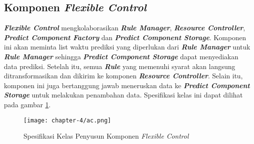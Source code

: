 \subsection{Komponen \textit{Flexible Control}}

\textbf{\textit{Flexible Control}} mengkolaborasikan \textbf{\textit{Rule Manager}}, \textbf{\textit{Resource Controller}}, \textbf{\textit{Predict Component Factory}} dan \textbf{\textit{Predict Component Storage}}. Komponen ini akan meminta list waktu prediksi yang diperlukan dari \textbf{\textit{Rule Manager}} untuk \textbf{\textit{Rule Manager}} sehingga \textbf{\textit{Predict Component Storage}} dapat menyediakan data prediksi. Setelah itu, semua \textbf{\textit{Rule}} yang memenuhi syarat akan langsung ditransformasikan dan dikirim ke komponen \textbf{\textit{Resource Controller}}. Selain itu, komponen ini juga bertanggung jawab meneruskan data ke \textbf{\textit{Predict Component Storage}} untuk melakukan penambahan data. Spesifikasi kelas ini dapat dilihat pada gambar \ref{fig:ac-spek}.

\begin{figure}[h]
    \centering
    \texttt{[image: chapter-4/ac.png]}
    \caption{Spesifikasi Kelas Penyusun Komponen \textit{Flexible Control}}
    \label{fig:ac-spek}
\end{figure}